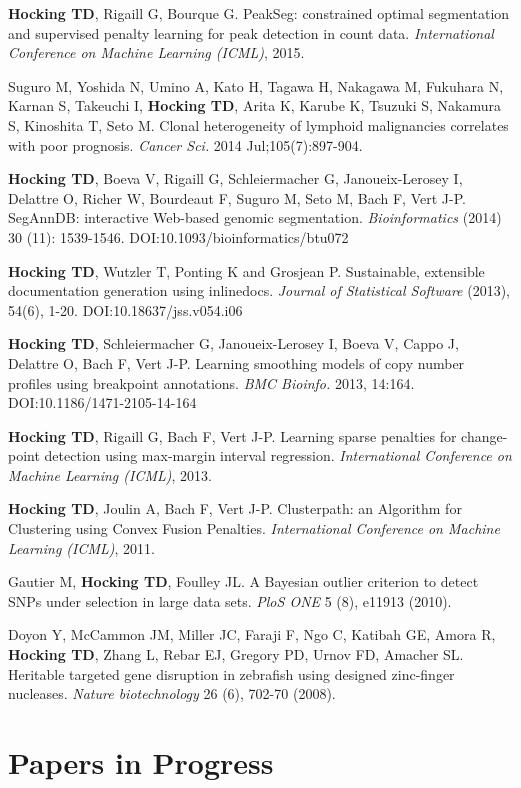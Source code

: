 \documentclass[margin,line]{res}
\begin{document}
\begin{resume}
{\bf Hocking TD}, Rigaill G, Bourque G. PeakSeg: constrained optimal
segmentation and supervised penalty learning for peak detection in
count data. {\it International Conference on Machine Learning (ICML)},
2015.

Suguro M, Yoshida N, Umino A, Kato H, Tagawa H, Nakagawa M, Fukuhara
N, Karnan S, Takeuchi I, {\bf Hocking TD}, Arita K, Karube K, Tsuzuki
S, Nakamura S, Kinoshita T, Seto M. Clonal heterogeneity of lymphoid
malignancies correlates with poor prognosis. {\it Cancer Sci.} 2014
Jul;105(7):897-904.

{\bf Hocking TD}, Boeva V, Rigaill G, Schleiermacher G,
Janoueix-Lerosey I, Delattre O, Richer W, Bourdeaut F, Suguro M, Seto
M, Bach F, Vert J-P. SegAnnDB: interactive Web-based genomic
segmentation. {\it Bioinformatics} (2014) 30 (11):
1539-1546. DOI:10.1093/bioinformatics/btu072

{\bf Hocking TD}, Wutzler T, Ponting K and Grosjean P. Sustainable,
extensible documentation generation using inlinedocs. {\it Journal of
Statistical Software} (2013), 54(6), 1-20. DOI:10.18637/jss.v054.i06

{\bf Hocking TD}, Schleiermacher G, Janoueix-Lerosey I, Boeva V, Cappo
J, Delattre O, Bach F, Vert J-P. Learning smoothing models of copy
number profiles using breakpoint annotations. {\it BMC Bioinfo.} 2013,
14:164. DOI:10.1186/1471-2105-14-164

{\bf Hocking TD}, Rigaill G, Bach F, Vert J-P. Learning sparse
penalties for change-point detection using max-margin interval
regression. {\it International Conference on Machine Learning (ICML)}, 2013.

{\bf Hocking TD}, Joulin A, Bach F, Vert J-P. Clusterpath: an
Algorithm for Clustering using Convex Fusion Penalties. {\it International Conference on Machine Learning (ICML)}, 2011.

Gautier M, {\bf Hocking TD}, Foulley JL. A Bayesian outlier criterion
to detect SNPs under selection in large data sets. {\it PloS ONE} 5
(8), e11913 (2010).

Doyon Y, McCammon JM, Miller JC, Faraji F, Ngo C, Katibah GE, Amora R,
{\bf Hocking TD}, Zhang L, Rebar EJ, Gregory PD, Urnov FD, Amacher
SL. Heritable targeted gene disruption in zebrafish using designed
zinc-finger nucleases. {\it Nature biotechnology} 26 (6), 702-70
(2008).

\section{\sc Papers in Progress}


\end{resume}
\end{document}
